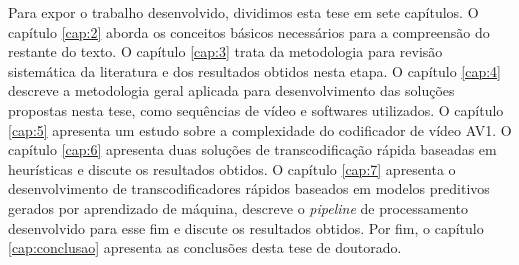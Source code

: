 Para expor o trabalho desenvolvido, dividimos esta tese em sete capítulos. O capítulo \ref{cap:2} aborda os conceitos básicos necessários para a compreensão do restante do texto. O capítulo \ref{cap:3} trata da metodologia para revisão sistemática da literatura e dos resultados obtidos nesta etapa. O capítulo \ref{cap:4} descreve a metodologia geral aplicada para desenvolvimento das soluções propostas nesta tese, como sequências de vídeo e softwares utilizados. O capítulo \ref{cap:5} apresenta um estudo sobre a complexidade do codificador de vídeo AV1. O capítulo \ref{cap:6} apresenta duas soluções de transcodificação rápida baseadas em heurísticas e discute os resultados obtidos. O capítulo \ref{cap:7} apresenta o desenvolvimento de transcodificadores rápidos baseados em modelos preditivos gerados por aprendizado de máquina, descreve o \textit{pipeline} de processamento desenvolvido para esse fim e discute os resultados obtidos. Por fim, o capítulo \ref{cap:conclusao} apresenta as conclusões desta tese de doutorado.
